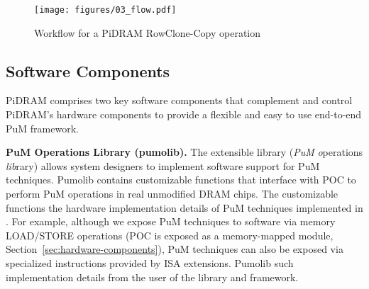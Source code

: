 \begin{figure*}[!t]
  \centering
  \texttt{[image: figures/03\_flow.pdf]}
  \caption{{Workflow for a PiDRAM RowClone-Copy operation}}%
  \label{fig:flow}
  
\end{figure*}
\subsection{Software Components}
\label{sec:software-components}
{PiDRAM comprises two key software components that complement {and control} PiDRAM's hardware components {to} provid{e} a flexible and easy to use {end-to-end} PuM framework.} 


\textbf{ PuM Operations Library (pumolib).} {The extensible library (\emph{PuM} \emph{o}perations \emph{lib}rary) allows system designers to implement software support for PuM techniques. Pumolib contains customizable functions that interface with POC to perform PuM operations in real unmodified DRAM chips. The customizable functions  the hardware implementation details of PuM techniques implemented in \X{} .} For example, {although we expose PuM techniques to software via memory LOAD/STORE operations (POC is exposed as a memory-mapped module, Section~\ref{sec:hardware-components}), PuM techniques can also be exposed via specialized instructions provided by ISA extensions.} Pumolib  such implementation details from the user of the library and  framework. 



